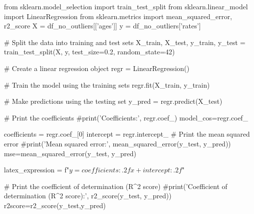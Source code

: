 \documentclass{beamer}
\begin{document}
\begin{pycode}
from sklearn.model_selection import train_test_split
from sklearn.linear_model import LinearRegression
from sklearn.metrics import mean_squared_error, r2_score
X = df_no_outliers[['ages']]
y = df_no_outliers['rates']

	# Split the data into training and test sets
X_train, X_test, y_train, y_test = train_test_split(X, y, test_size=0.2, random_state=42)

# Create a linear regression object
regr = LinearRegression()

# Train the model using the training sets
regr.fit(X_train, y_train)

# Make predictions using the testing set
y_pred = regr.predict(X_test)

# Print the coefficients
#print('Coefficients:', regr.coef_)
model_cos=regr.coef_

coefficients = regr.coef_[0]
intercept = regr.intercept_
# Print the mean squared error
#print('Mean squared error:', mean_squared_error(y_test, y_pred))
mse=mean_squared_error(y_test, y_pred)

latex_expression = f"$y = {coefficients:.2f}x + {intercept:.2f}$"

# Print the coefficient of determination (R^2 score)
#print('Coefficient of determination (R^2 score):', r2_score(y_test, y_pred))
r2score=r2_score(y_test,y_pred)
\end{pycode}
\end{document}
